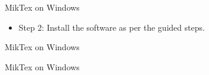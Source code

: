 \documentclass [9pt] {beamer}
\begin{document}
\begin{frame}{MikTex on Windows}%
\begin{itemize}
\item {Step 2: Install the software as per the guided steps.}
\end{itemize}
\end{frame}


\begin{frame}{MikTex on Windows}%
\begin{figure}
\end{figure}
\end{frame}

\begin{frame}{MikTex on Windows}%
\begin{figure}
\end{figure}
\end{frame}
\end{document}
